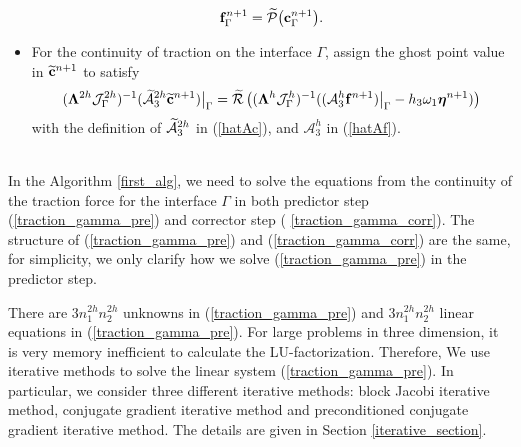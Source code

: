 \begin{breakablealgorithm}
\begin{itemize}
{			\begin{equation*}
			{\bf f}^{n+1}_{\Gamma} = \widetilde{\mathcal{P}}\big({\bf c}^{n+1}_{\Gamma}\big).
			\end{equation*}
		}
		\item{For the continuity of traction on the interface $\Gamma$, assign the ghost point value in $\widetilde{\bf c}^{n+1}$ to satisfy
			\begin{equation}\label{traction_gamma_corr}
			(\bm{\Lambda}^{2h}{\mathcal J}_{\Gamma}^{2h})^{-1}(\wt{\mathcal{A}}_3^{2h}\wt{\bf c}^{n+1})\big|_\Gamma
			= \wt{\mathcal{R}}\left((\bm{\Lambda}^{h}{\mathcal J}^h_{\Gamma})^{-1}((\mathcal{A}_3^h{\bf f}^{n+1})\big|_\Gamma-h_3\omega_1{\bm \eta}^{n+1})\right)
			\end{equation}
			with the definition of $\widetilde{\mathcal{A}}_3^{2h}$ in (\ref{hatAc}), and $\mathcal{A}_3^h$ in (\ref{hatAf}).
		}
	\end{itemize}
\end{breakablealgorithm}
~\\

In the Algorithm \ref{first_alg}, we need to solve the equations from the continuity of the traction force for the interface $\Gamma$ in both predictor step (\ref{traction_gamma_pre}) and corrector step (
\ref{traction_gamma_corr}). The structure of (\ref{traction_gamma_pre}) and (\ref{traction_gamma_corr}) are the same, for simplicity, we only clarify how we solve (\ref{traction_gamma_pre}) in the predictor step.

There are $3n_1^{2h}n_2^{2h}$ unknowns in (\ref{traction_gamma_pre}) and $3n_1^{2h}n_2^{2h}$ linear equations in (\ref{traction_gamma_pre}). For large problems in three dimension, it is very memory inefficient to calculate the LU-factorization. Therefore, We use iterative methods to solve the linear system (\ref{traction_gamma_pre}). In particular, we consider three different iterative methods: block Jacobi iterative method, conjugate gradient iterative method and preconditioned conjugate gradient iterative method. The details are given in Section \ref{iterative_section}.
